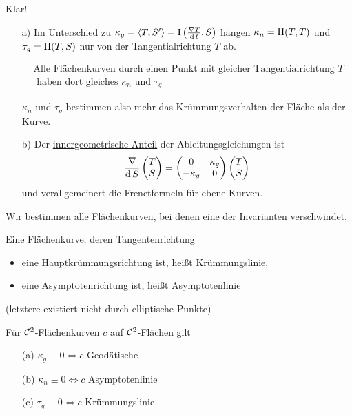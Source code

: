 \begin{beweis}
 Klar!
\end{beweis}

\begin{folgerung}
 \begin{enumerate}
  \item[a)] Im Unterschied zu \(\kappa_g = \langle T, S' \rangle = \Rom1 \left( \frac{\nabla T}{\dd t}, S \right)\) hängen \(\kappa_n = \Rom2 (T,T)\) und \(\tau_g = \Rom2 (T,S) \) nur von der Tangentialrichtung \(T\) ab. \par
   \(\boxed{\begin{aligned}
             &\text{Alle Flächenkurven durch einen Punkt mit gleicher Tangentialrichtung } T \\
             &\text{ haben dort gleiches } \kappa_n \text{ und } \tau_g
            \end{aligned}}\) \par
   \(\kappa_n\) und \(\tau_g\) bestimmen also mehr das Krümmungsverhalten der Fläche als der Kurve.
  \item[b)] Der \uline{innergeometrische Anteil} der Ableitungsgleichungen ist
   \[
    \frac{\nabla}{\operatorname{d} S} \begin{pmatrix} T \\ S \end{pmatrix}  = \begin{pmatrix}
					0 & \kappa_g \\
					-\kappa_g & 0
				      \end{pmatrix} \begin{pmatrix} T \\ S \end{pmatrix} 
   \]
   und verallgemeinert die Frenetformeln für ebene Kurven. \par
{}
 \end{enumerate}
\end{folgerung}

Wir bestimmen alle Flächenkurven, bei denen eine der Invarianten verschwindet.

\begin{definition}
 Eine Flächenkurve, deren Tangentenrichtung 
 \begin{itemize}
  \item eine Hauptkrümmungsrichtung ist, heißt \uline{Krümmungslinie},
  \item eine Asymptotenrichtung ist, heißt \uline{Asymptotenlinie}
 \end{itemize}
 (letztere existiert nicht durch elliptische Punkte)
\end{definition}

\begin{satz}\label{satz242}
 Für \(\mathcal{C}^2\)-Flächenkurven \(c\) auf \(\mathcal{C}^2\)-Flächen gilt
 \begin{enumerate}
  \item[(a)] \(\kappa_g \equiv 0 \Leftrightarrow c\) Geodätische
  \item[(b)] \(\kappa_n \equiv 0 \Leftrightarrow c\) Asymptotenlinie
  \item[(c)] \(\tau_g \equiv 0 \Leftrightarrow c\) Krümmungslinie
 \end{enumerate}
\end{satz}

